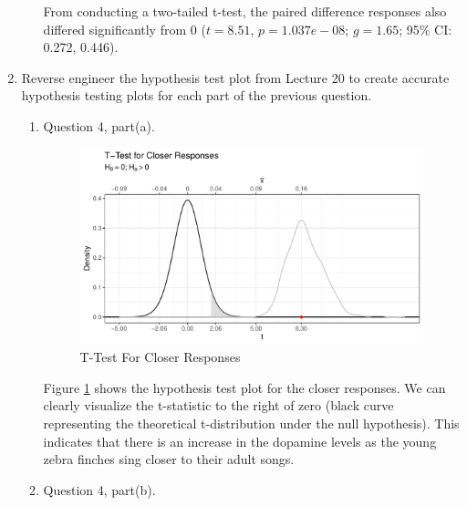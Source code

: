 \documentclass{article}\usepackage[]{graphicx}\usepackage[]{xcolor}
\makeatletter
\def\maxwidth{ %
  \ifdim\Gin@nat@width>\linewidth
    \linewidth
  \else
    \Gin@nat@width
  \fi
}
\newenvironment{knitrout}{}{} %
\makeatother
\begin{document}
\begin{enumerate}
\begin{enumerate}
From conducting a two-tailed t-test, the paired difference responses also differed significantly from 0 ($t=8.51$, $p = 1.037e-08$; $g=1.65  $; 95\% CI: 0.272, 0.446).  
  
\end{enumerate}
\item Reverse engineer the hypothesis test plot from Lecture 20 to create accurate
hypothesis testing plots for each part of the previous question.
\begin{enumerate}
  \item Question 4, part(a).

\begin{figure}[H]
\begin{center}
\begin{knitrout}
\color{fgcolor}

{\centering \includegraphics[width=\maxwidth]{figure/unnamed-chunk-17-1} 

}


\end{knitrout}
\caption{T-Test For Closer Responses}
\label{plot2} 
\end{center}
\end{figure}

Figure \ref{plot2} shows the hypothesis test plot for the closer responses. We can clearly visualize the t-statistic to the right of zero (black curve representing the theoretical t-distribution under the null hypothesis). This indicates that there is an increase in the dopamine levels as the young zebra finches sing closer to their adult songs.

  \item Question 4, part(b).


\end{enumerate}
\end{enumerate}
\end{document}
